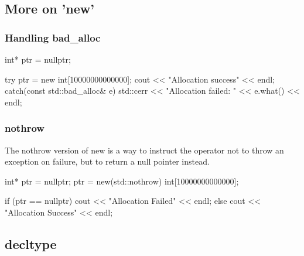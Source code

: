 \documentclass{report}
\begin{document}
    \bigbreak \noindent 
    \subsection{More on 'new'}
    \bigbreak \noindent 
    \subsubsection{Handling bad\_alloc}
    \bigbreak \noindent 
    \begin{cppcode}
        int* ptr = nullptr;

        try {
            ptr = new int[10000000000000];
            cout << "Allocation success" << endl;
        } catch(const std::bad_alloc& e) {
        }
        std::cerr << "Allocation failed: " << e.what() << endl;
    \end{cppcode}

    \bigbreak \noindent 
    \subsubsection{nothrow}
    \bigbreak \noindent 
    The nothrow version of new is a way to instruct the operator not to throw an exception on failure, but to return a null pointer instead.
    \bigbreak \noindent 
    \begin{cppcode}
        int* ptr = nullptr;
        ptr = new(std::nothrow) int[10000000000000];

        if (ptr == nullptr) {
            cout << "Allocation Failed" << endl;
        } else {
            cout << "Allocation Success" << endl;
        }
    \end{cppcode}

    \pagebreak 
    \bigbreak \noindent 

    \bigbreak \noindent 
    \subsection{decltype}
\end{document}
